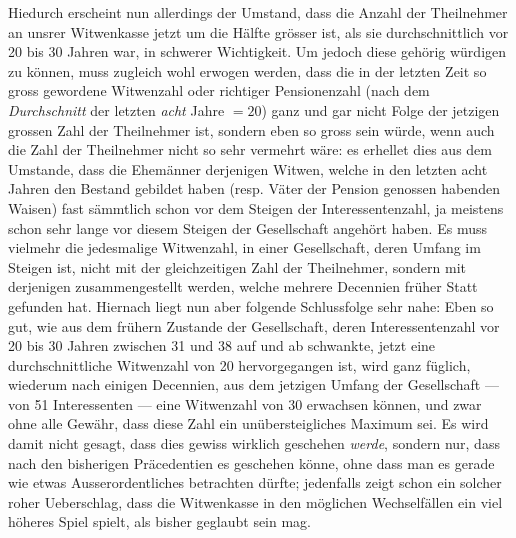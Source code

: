 Hiedurch erscheint nun allerdings der Umstand, dass die Anzahl der Theilnehmer an unsrer Witwenkasse jetzt um die Hälfte grösser ist, als sie durchschnittlich vor 20 bis 30 Jahren war, in schwerer Wichtigkeit. Um jedoch diese gehörig würdigen zu können, muss zugleich wohl erwogen werden, dass die in der letzten Zeit so gross gewordene Witwenzahl oder richtiger Pensionenzahl (nach dem \textit{Durchschnitt} der letzten \textit{acht} Jahre \(=20\)) ganz und gar nicht Folge der jetzigen grossen Zahl der Theilnehmer ist, sondern eben so gross sein würde, wenn auch die Zahl der Theilnehmer nicht so sehr vermehrt wäre: es erhellet dies aus dem Umstande, dass die Ehemänner derjenigen Witwen, welche in den letzten acht Jahren den Bestand gebildet haben (resp. Väter der Pension genossen habenden Waisen) fast sämmtlich schon vor dem Steigen der Interessentenzahl, ja meistens schon sehr lange vor diesem Steigen der Gesellschaft angehört haben. Es muss vielmehr die jedesmalige Witwenzahl, in einer Gesellschaft, deren Umfang im Steigen ist, nicht mit der gleichzeitigen Zahl der Theilnehmer, sondern mit derjenigen zusammengestellt werden, welche mehrere Decennien früher Statt gefunden hat. Hiernach liegt nun aber folgende Schlussfolge sehr nahe: Eben so gut, wie aus dem frühern Zustande der Gesellschaft, deren Interessentenzahl vor 20 bis 30 Jahren zwischen 31 und 38 auf und ab schwankte, jetzt eine durchschnittliche Witwenzahl von 20 hervorgegangen ist, wird ganz füglich, wiederum nach einigen Decennien, aus dem jetzigen Umfang der Gesellschaft — von 51 Interessenten — eine Witwenzahl von 30 erwachsen können, und zwar ohne alle Gewähr, dass diese Zahl ein unübersteigliches Maximum sei. Es wird damit nicht gesagt, dass dies gewiss wirklich geschehen \textit{werde}, sondern nur, dass nach den bisherigen Präcedentien es geschehen könne, ohne dass man es gerade wie etwas Ausserordentliches betrachten dürfte; jedenfalls zeigt schon ein solcher roher Ueberschlag, dass die Witwenkasse in den möglichen Wechselfällen ein viel höheres Spiel spielt, als bisher geglaubt sein mag.
